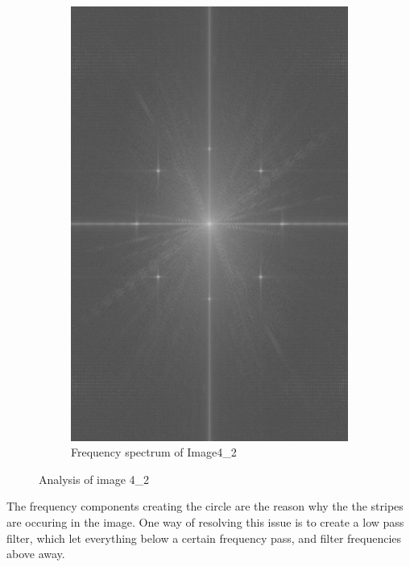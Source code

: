 \begin{figure}[H]
\begin{subfigure}[b]{0.3\textwidth}
        \label{fig:img42_src}
    \end{subfigure}
    \begin{subfigure}[b]{0.291\textwidth}
        \includegraphics[width=\textwidth]{img4/Image4_2_freq_spec.png}
        \caption{Frequency spectrum of Image4\_2}
        \label{fig:img1_hist}
    \end{subfigure}
    \caption{Analysis of image 4\_2}\label{fig:img1}
\end{figure}

The frequency components creating the circle are the reason why the the stripes are occuring in the image.  One way of resolving this issue is to create a low pass filter, which let everything below a certain frequency pass, and  filter frequencies above away. \\

